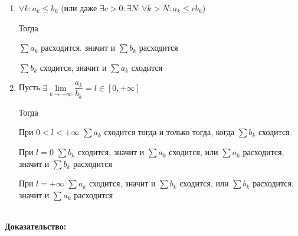 \documentclass[../main.tex]{subfiles}
\begin{document}
                \begin{enumerate}
                
                    \item $\forall k : a_k \leq b_k$ (или даже $\exists c > 0 : \exists N : \forall k > N : a_k \leq c b_k$)
                    
                        Тогда
                        
                            $\sum a_k$ расходится. значит и $\sum b_k$ расходится
                            
                            $\sum b_k$ сходится, значит и $\sum a_k$ сходится
                            
                    \item Пусть $\exists \lim\limits_{k \rightarrow +\infty} \dfrac{a_k}{b_k} = l \in [0, +\infty]$
                    
                        Тогда
                        
                            При $0 < l < +\infty$ $\sum a_k$ сходится тогда и только тогда, когда $\sum b_k$ сходится
                            
                            При $l = 0$ $\sum b_k$ сходится, значит и $\sum a_k$ сходится, или $\sum a_k$ расходится, значит и $\sum b_k$ расходится
                            
                            При $l = +\infty$ $\sum a_k$ сходится, значит и $\sum b_k$ сходится, или $\sum b_k$ расходится, значит и $\sum a_k$ расходится
                            
                \end{enumerate}
 \\
            \textbf{Доказательство:}
            
\end{document}
